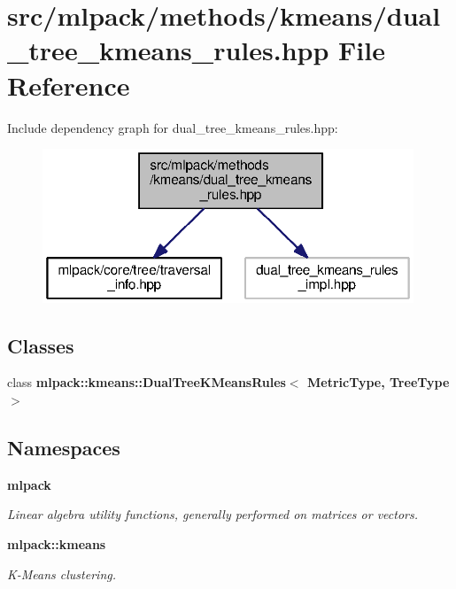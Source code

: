 \section{src/mlpack/methods/kmeans/dual\+\_\+tree\+\_\+kmeans\+\_\+rules.hpp File Reference}
\label{dual__tree__kmeans__rules_8hpp}
Include dependency graph for dual\+\_\+tree\+\_\+kmeans\+\_\+rules.\+hpp\+:
\nopagebreak
\begin{figure}[H]
\begin{center}
\leavevmode
\includegraphics[width=314pt]{dual__tree__kmeans__rules_8hpp__incl}
\end{center}
\end{figure}
\subsection*{Classes}
\begin{DoxyCompactItemize}
\item 
class {\bf mlpack\+::kmeans\+::\+Dual\+Tree\+K\+Means\+Rules$<$ Metric\+Type, Tree\+Type $>$}
\end{DoxyCompactItemize}
\subsection*{Namespaces}
\begin{DoxyCompactItemize}
\item 
 {\bf mlpack}
\begin{DoxyCompactList}\small\item\em Linear algebra utility functions, generally performed on matrices or vectors. \end{DoxyCompactList}\item 
 {\bf mlpack\+::kmeans}
\begin{DoxyCompactList}\small\item\em K-\/\+Means clustering. \end{DoxyCompactList}\end{DoxyCompactItemize}
